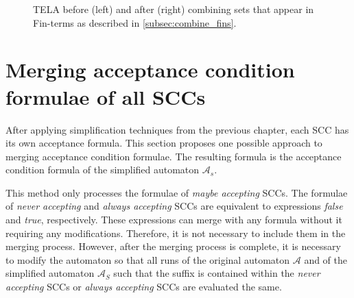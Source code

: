 \documentclass[
  digital, %
  twoside, %
  table,   %
  lof,     %
  lot,     %
]{fithesis3}
\begin{document}
\begin{figure}[h]
  \centering
  \caption{TELA before (left) and after (right) combining sets that appear in Fin-terms as described in \protect \ref{subsec:combine_fins}.}
  \label{fig:combine_fins}
\end{figure}

\section{Merging acceptance condition formulae of all SCCs}
\label{sec:merging_formulae}
After applying simplification techniques from the previous chapter, each SCC has its own acceptance formula. This section proposes one possible approach to merging acceptance condition formulae. The resulting formula is the acceptance condition formula of the simplified automaton $\mathcal{A}_s$.

This method only processes the formulae of \emph{maybe accepting} SCCs. The formulae of \emph{never accepting} and \emph{always accepting} SCCs are equivalent to expressions \emph{false} and \emph{true}, respectively. These expressions can merge with any formula without it requiring any modifications. Therefore, it is not necessary to include them in the merging process. However, after the merging process is complete, it is necessary to modify the automaton so that all runs of the original automaton $\mathcal{A}$ and of the simplified automaton $\mathcal{A}_S$ such that the suffix is contained within the \emph{never accepting} SCCs or \emph{always accepting} SCCs are evaluated the same. 
\end{document}
